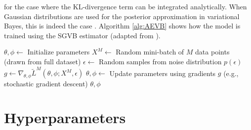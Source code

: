 \documentclass{mldsmsc}
\begin{document}
for the case where the KL-divergence term can be integrated analytically. When Gaussian distributions are used for the posterior approximation in variational Bayes,  this is indeed the case \citep{kingma2013auto}. Algorithm \ref{alg:AEVB} shows how the model is trained using the SGVB estimator (adapted from \cite{kingma2013auto}).

\begin{algorithm}%
	\caption{Mini-batch version of the Auto-Encoding VB (AEVB) algorithm using the SGVB estimator in equation \ref{SGVB}  }
	\label{alg:AEVB}
	\begin{algorithmic}[1] %
		\State $\theta, \phi \gets$ Initialize parameters
		\Repeat
		\State $X^M \gets$ Random mini-batch of $M$ data points (drawn from full dataset)
		\State $\epsilon \gets$ Random samples from noise distribution $p(\epsilon)$
		\State $g \gets \nabla_{\theta, \phi} \tilde{L}^M(\theta, \phi; X^M, \epsilon)$ 
		\State $\theta, \phi \gets$ Update parameters using gradients $g$ (e.g., stochastic gradient descent)
		\State \Return $\theta, \phi$
	\end{algorithmic}
\end{algorithm}

\section{Hyperparameters}
\end{document}
